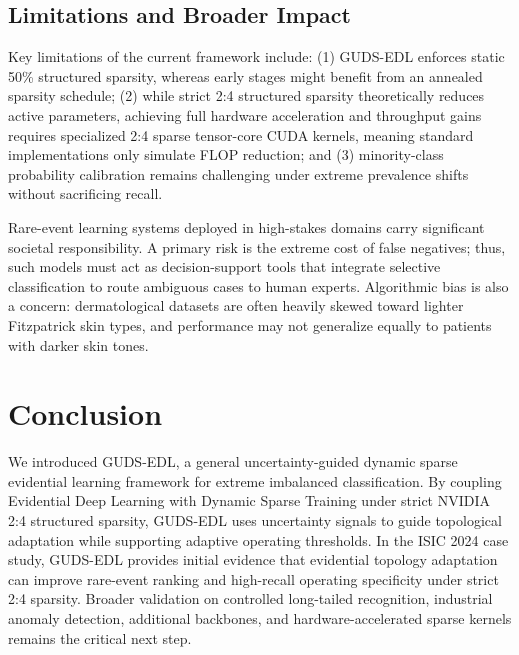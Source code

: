 \documentclass[letterpaper]{article} %
\begin{document}
\subsection{Limitations and Broader Impact}
Key limitations of the current framework include: (1) GUDS-EDL enforces static 50\% structured sparsity, whereas early stages might benefit from an annealed sparsity schedule; (2) while strict 2:4 structured sparsity theoretically reduces active parameters, achieving full hardware acceleration and throughput gains requires specialized 2:4 sparse tensor-core CUDA kernels, meaning standard implementations only simulate FLOP reduction; and (3) minority-class probability calibration remains challenging under extreme prevalence shifts without sacrificing recall.

Rare-event learning systems deployed in high-stakes domains carry significant societal responsibility. A primary risk is the extreme cost of false negatives; thus, such models must act as decision-support tools that integrate selective classification to route ambiguous cases to human experts. Algorithmic bias is also a concern: dermatological datasets are often heavily skewed toward lighter Fitzpatrick skin types, and performance may not generalize equally to patients with darker skin tones.

\section{Conclusion}\label{sec:conclusion}
We introduced GUDS-EDL, a general uncertainty-guided dynamic sparse evidential learning framework for extreme imbalanced classification. By coupling Evidential Deep Learning with Dynamic Sparse Training under strict NVIDIA 2:4 structured sparsity, GUDS-EDL uses uncertainty signals to guide topological adaptation while supporting adaptive operating thresholds. In the ISIC 2024 case study, GUDS-EDL provides initial evidence that evidential topology adaptation can improve rare-event ranking and high-recall operating specificity under strict 2:4 sparsity. Broader validation on controlled long-tailed recognition, industrial anomaly detection, additional backbones, and hardware-accelerated sparse kernels remains the critical next step.
\end{document}
